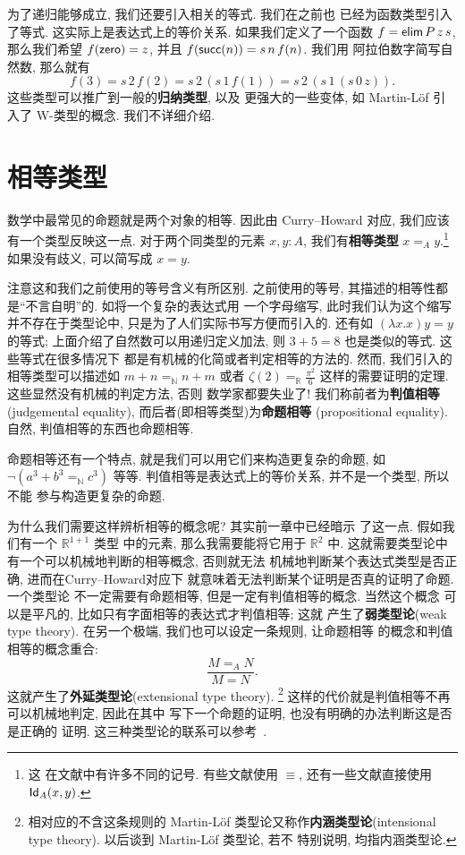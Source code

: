 为了递归能够成立, 我们还要引入相关的等式. 我们在之前也
已经为函数类型引入了等式. 这实际上是表达式上的等价关系.
如果我们定义了一个函数 \(f = \textsf{elim}\,P\,z\,s\),
那么我们希望 \(f(\textsf{zero}) = z\), 并且
\(f(\textsf{succ}(n)) = s\,n\,f(n)\). 我们用
阿拉伯数字简写自然数, 那么就有
\[f(3) = s\,2\,f(2) = s\,2\,(s\,1\,f(1)) = s\,2\,(s\,1\,(s\,0\,z)).\]
这些类型可以推广到一般的\textbf{归纳类型}, 以及
更强大的一些变体, 如 Martin-L\"of 引入了 W-类型的概念.
我们不详细介绍.

\section{相等类型}\label{martinlof:identity}
数学中最常见的命题就是两个对象的相等. 因此由 Curry--Howard
对应, 我们应该有一个类型反映这一点. 对于两个同类型的元素
\(x,y : A\), 我们有\textbf{相等类型} \(x =_A y\).\footnote{这
在文献中有许多不同的记号. 有些文献使用 \(\equiv\),
还有一些文献直接使用 \(\textsf{Id}_A(x,y)\).}
如果没有歧义, 可以简写成 \(x = y\).

注意这和我们之前使用的等号含义有所区别. 之前使用的等号,
其描述的相等性都是“不言自明”的. 如将一个复杂的表达式用
一个字母缩写, 此时我们认为这个缩写并不存在于类型论中,
只是为了人们实际书写方便而引入的. 还有如 \((\lambda x.x)y = y\)
的等式; 上面介绍了自然数可以用递归定义加法, 则
\(3 + 5 = 8\) 也是类似的等式. 这些等式在很多情况下
都是有机械的化简或者判定相等的方法的. 然而, 我们引入的
相等类型可以描述如 \(m + n =_{\mathbb N} n + m\) 或者 \(\zeta(2) =_{\mathbb R} \frac{\pi^2}{6}\)
这样的需要证明的定理. 这些显然没有机械的判定方法, 否则
数学家都要失业了!
我们称前者为\textbf{判值相等} (judgemental equality),
而后者(即相等类型)为\textbf{命题相等} (propositional equality).
自然, 判值相等的东西也命题相等.

命题相等还有一个特点, 就是我们可以用它们来构造更复杂的命题,
如 \(\neg (a^3 + b^3 =_{\mathbb N} c^3)\) 等等.
判值相等是表达式上的等价关系, 并不是一个类型, 所以不能
参与构造更复杂的命题.

为什么我们需要这样辨析相等的概念呢? 其实前一章中已经暗示
了这一点. 假如我们有一个 \(\mathbb R^{1+1}\) 类型
中的元素, 那么我需要能将它用于 \(\mathbb R^2\) 中.
这就需要类型论中有一个可以机械地判断的相等概念, 否则就无法
机械地判断某个表达式类型是否正确, 进而在Curry--Howard对应下
就意味着无法判断某个证明是否真的证明了命题. 一个类型论
不一定需要有命题相等, 但是一定有判值相等的概念. 当然这个概念
可以是平凡的, 比如只有字面相等的表达式才判值相等; 这就
产生了\textbf{弱类型论}(weak type theory).
在另一个极端, 我们也可以设定一条规则, 让命题相等
的概念和判值相等的概念重合:
\[\frac{M =_A N}{M = N}.\]
这就产生了\textbf{外延类型论}(extensional type theory).%
\footnote{相对应的不含这条规则的 Martin-L\"of
类型论又称作\textbf{内涵类型论}(intensional
type theory). 以后谈到 Martin-L\"of 类型论, 若不
特别说明, 均指内涵类型论.}
这样的代价就是判值相等不再可以机械地判定, 因此在其中
写下一个命题的证明, 也没有明确的办法判断这是否是正确的
证明. 这三种类型论的联系可以参考~\cite{winterhalter:2018:ettwtt}.

